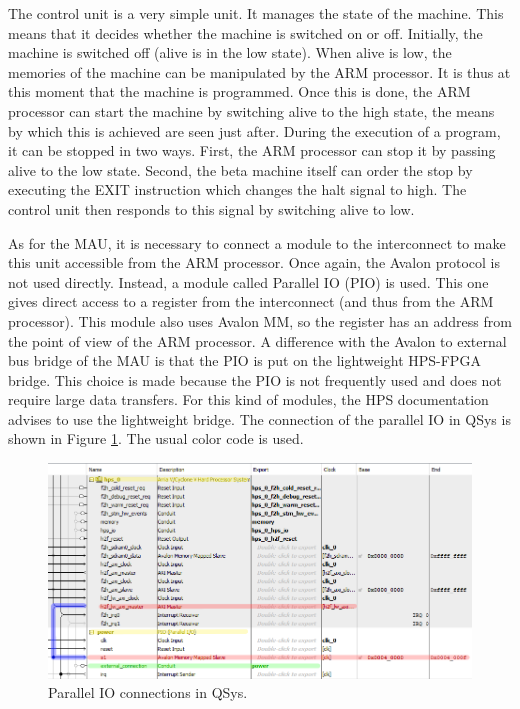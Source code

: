 The control unit is a very simple unit. It manages the state of the machine. This means that 
it decides whether the machine is switched on or off. Initially, the machine is switched off (alive 
is in the low state). When alive is low, the memories of the machine can be manipulated by the ARM 
processor. It is thus at this moment that the machine is programmed. Once this is done, the ARM 
processor can start the machine by switching alive to the high state, the means by which this is 
achieved are seen just after. During the execution of a program, it can be stopped in two ways. 
First, the ARM processor can stop it by passing alive to the low state. Second, 
the beta machine itself can order the stop by executing the EXIT instruction which changes the 
halt signal to high. The control unit then responds to this signal by switching alive to low.

As for the MAU, it is necessary to connect a module to the interconnect to make this unit 
accessible from the ARM processor. Once again, the Avalon protocol is not used directly. 
Instead, a module called Parallel IO (PIO) is used. This one gives direct access to a register 
from the interconnect (and thus from the ARM processor). This module also uses Avalon MM, so 
the register has an address from the point of view of the ARM processor. A difference with 
the Avalon to external bus bridge of the MAU is that the PIO is put on the lightweight HPS-FPGA 
bridge. This choice is made because the PIO is not frequently used and does not require large data 
transfers. For this kind of modules, the HPS documentation advises to use the lightweight bridge.
The connection of the parallel IO in QSys is shown in Figure \ref{fig:qsys/ctrlu}. The usual color code is used.

\begin{figure}[ht!]
    \center
    \includegraphics[width=\linewidth]{"Chapter5-MAU_CTRLU/res/qsys_ctrlu.PNG"}
    \caption{Parallel IO connections in QSys.}
    \label{fig:qsys/ctrlu}
\end{figure}

